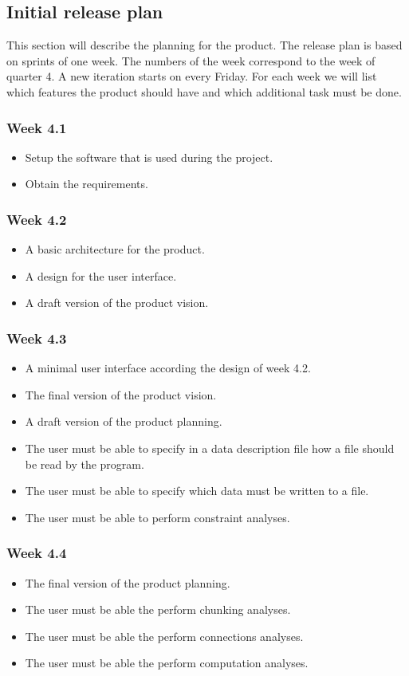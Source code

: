 \subsection{Initial release plan}
\label{subsec: release-plan}
This section will describe the planning for the product. The release plan is based on sprints of one week. The numbers of the week correspond to the week of quarter 4. A new iteration starts on every Friday. For each week we will list which features the product should have and which additional task must be done.
\subsubsection{Week 4.1}
\begin{itemize}
	\item Setup the software that is used during the project.
	\item Obtain the requirements.
\end{itemize}

\subsubsection{Week 4.2}
\begin{itemize}
\item A basic architecture for the product.
\item A design for the user interface.
\item A draft version of the product vision.
\end{itemize}
\subsubsection{Week 4.3}
\begin{itemize}
	\item A minimal user interface according the design of week 4.2.
	\item The final version of the product vision.
	\item A draft version of the product planning.
	\item The user must be able to specify in a data description file how a file should be read by the program.
	\item The user must be able to specify which data must be written to a file.
	\item The user must be able to perform constraint analyses.
\end{itemize}
\subsubsection{Week 4.4}
\begin{itemize}
	\item The final version of the product planning.
	\item The user must be able the perform chunking analyses.
	\item The user must be able the perform connections analyses.
	\item The user must be able the perform computation analyses.
\end{itemize}
